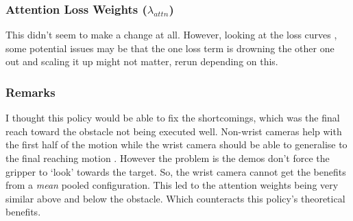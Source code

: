 \subsubsection{Attention Loss Weights ($\lambda_{attn}$)}
This didn't seem to make a change at all. However, looking at the loss curves , some potential issues may be that the one loss term is drowning the other one out and scaling it up might not matter, rerun depending on this.


\subsubsection{Remarks}
I thought this policy would be able to fix the shortcomings, which was the final reach toward the obstacle not being executed well. Non-wrist cameras help with the first half of the motion while the wrist camera should be able to generalise to the final reaching motion . However the problem is the demos don't force the gripper to `look' towards the target. So, the wrist camera cannot get the benefits from a \emph{mean} pooled configuration. This led to the attention weights being very similar above and below the obstacle. Which counteracts this policy's theoretical benefits.

